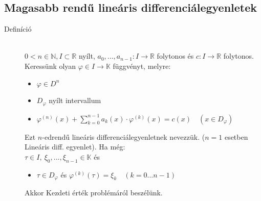 \documentclass[margin=0px]{article}
\newcommand{\R}{\mathbb{R}}
\begin{document}
		\subsection{Magasabb rendű lineáris differenciálegyenletek}
			\begin{description}
				\item[Definíció] \hfill \\
				$ 0 < n \in \mathbb{N}, I \subset \R$ nyílt, $ a_0, ... ,a_{n-1} :I \rightarrow \R$  folytonos és $ c: I \rightarrow \R$ folytonos. \\
				Keressünk olyan $ \varphi \in I \rightarrow \mathbb{K}$ függvényt, melyre: 
				\begin{itemize}
					\item $ \varphi \in D^n$
					\item $ D_{\varphi}$ nyílt intervallum 
					\item $ \varphi^{(n)}(x) + \sum\limits_{k=0}^{n-1}a_k(x) \cdot \varphi^{(k)}(x) = c(x) \quad (x \in D_{\varphi}) $
				\end{itemize}
				
				Ezt $n$-edrendű lineáris differenciálegyenletnek nevezzük. ($n=1$ esetben Lineáris diff. egyenlet). Ha még: \\
				$ \tau \in I, \ \xi_0, ... , \xi_{n-1} \in \mathbb{K}$ és 
				\begin{itemize}
					\item $ \tau \in D_{\varphi}$ és $ \varphi^{(k)}(\tau) = \xi_k \quad (k = 0...n-1) $
				\end{itemize}
				Akkor Kezdeti érték problémáról beszélünk.
				

\end{description}
\end{document}
